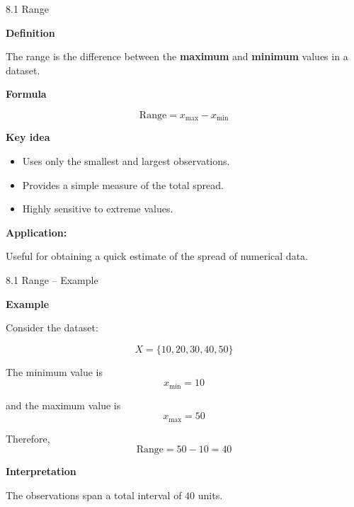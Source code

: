\begin{frame}{8.1 Range}

\textbf{Definition}

The range is the difference between the \textbf{maximum} and
\textbf{minimum} values in a dataset.

\vspace{0.5cm}

\textbf{Formula}

\[
\boxed{
\text{Range} = x_{\max} - x_{\min}
}
\]

\vspace{0.5cm}

\textbf{Key idea}

\begin{itemize}
    \item Uses only the smallest and largest observations.
    \item Provides a simple measure of the total spread.
    \item Highly sensitive to extreme values.
\end{itemize}

\vspace{0.3cm}

\textbf{Application:}

Useful for obtaining a quick estimate of the spread of
numerical data.

\end{frame}



\begin{frame}{8.1 Range -- Example}

\textbf{Example}

Consider the dataset:

\[
X=\{10,20,30,40,50\}
\]

The minimum value is
\[
x_{\min}=10
\]

and the maximum value is
\[
x_{\max}=50
\]

\vspace{0.1cm}

Therefore,
\[
\text{Range}
=
50-10
=
\boxed{40}
\]

\vspace{0.1cm}

\textbf{Interpretation}

The observations span a total interval of $40$ units.

\end{frame}


